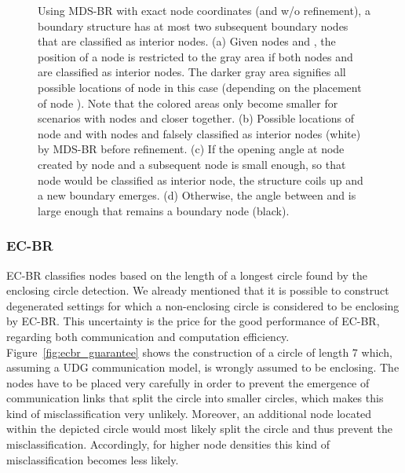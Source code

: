 \documentclass{llncs}
\begin{document}
\begin{figure}[t]
\centering
\hfill
{}
\hfill
{}
\hfill
{}
\hfill
{}
\hfill{}
\caption{Using MDS-BR with exact node coordinates (and w/o refinement), a boundary structure has at most two subsequent boundary nodes that are classified as interior nodes.
(a) Given nodes  and , the position of a node  is restricted to the gray area if both nodes  and  are classified as interior nodes.
The darker gray area signifies all possible locations of node  in this case (depending on the placement of node ).
Note that the colored areas only become smaller for scenarios with nodes  and  closer together.
(b) Possible locations of node  and  with nodes  and  falsely classified as interior nodes (white) by MDS-BR before refinement.
(c) If the opening angle at node  created by node  and a subsequent node  is small enough, so that node  would be classified as interior node, the structure coils up and a new boundary emerges.
(d) Otherwise, the angle between  and  is large enough that  remains a boundary node (black).}
\label{fig:mdsbr_guarantee_2}
\end{figure}

\subsubsection{EC-BR}

EC-BR classifies nodes based on the length of a longest circle found by the enclosing circle detection.
We already mentioned that it is possible to construct degenerated settings for which a non-enclosing circle is considered to be enclosing by EC-BR.
This uncertainty is the price for the good performance of EC-BR, regarding both communication and computation efficiency.
Figure~\ref{fig:ecbr_guarantee} shows the construction of a circle of length 7 which, assuming a UDG communication model, is wrongly assumed to be enclosing. 
The nodes have to be placed very carefully in order to prevent the emergence of communication links that split the circle into smaller circles, which makes this kind of misclassification very unlikely.
Moreover, an additional node located within the depicted circle would most likely split the circle and thus prevent the misclassification.
Accordingly, for higher node densities this kind of misclassification becomes less likely.
\end{document}
